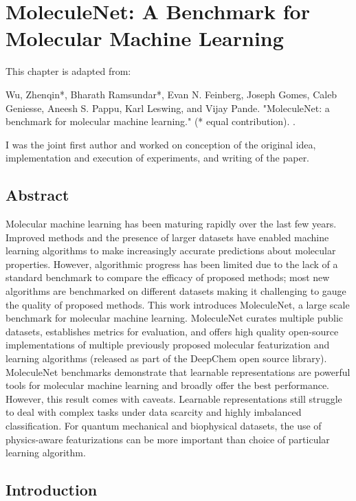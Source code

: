 \section{MoleculeNet: A Benchmark for Molecular Machine Learning}

This chapter is adapted from: 

Wu, Zhenqin*, Bharath Ramsundar*, Evan N. Feinberg, Joseph Gomes, Caleb Geniesse, Aneesh S. Pappu, Karl Leswing, and Vijay Pande. "MoleculeNet: a benchmark for molecular machine learning." (* equal contribution). \cite{wu2017moleculenet}.

I was the joint first author and worked on conception of the original idea, implementation and execution of experiments, and writing of the paper.

\subsection{Abstract}
Molecular machine learning has been maturing rapidly over the last few years. Improved methods and the presence of larger datasets have enabled machine learning algorithms to make increasingly accurate predictions about molecular properties. However, algorithmic progress has been limited due to the lack of a standard benchmark to compare the efficacy of proposed methods; most new algorithms are benchmarked on different datasets making it challenging to gauge the quality of proposed methods. This work introduces MoleculeNet, a large scale benchmark for molecular machine learning. MoleculeNet curates multiple public datasets, establishes metrics for evaluation, and offers high quality open-source implementations of multiple previously proposed molecular featurization and learning algorithms (released as part of the DeepChem open source library). MoleculeNet benchmarks demonstrate that learnable representations are powerful tools for molecular machine learning and broadly offer the best performance. However, this result comes with caveats. Learnable representations still struggle to deal with complex tasks under data scarcity and highly imbalanced classification. For quantum mechanical and biophysical datasets, the use of physics-aware featurizations can be more important than choice of particular learning algorithm. 

\subsection{Introduction} \label{Introduction}

